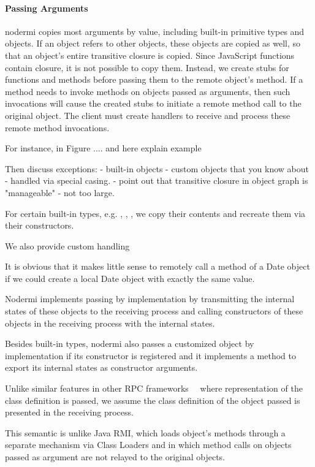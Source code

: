 \paragraph{Passing Arguments}
nodermi copies most arguments by value, including built-in primitive types
and objects.  If an object refers to other objects, these objects are copied 
as well, so that an object's entire transitive closure is copied.
Since JavaScript functions contain closure, it is not possible to copy them.
Instead, we create stubs for functions and methods before passing them
to the remote object's method.  If a method needs to invoke 
methods on objects passed as arguments, then such invocations
will cause the created stubs to initiate a remote method
call to the original object.  The client must create handlers
to receive and process these remote method invocations.

For instance, in Figure ....
and here explain example

Then discuss exceptions:
- built-in objects
- custom objects that you know about - handled via special casing.
- point out that transitive closure in object graph is "manageable" - not too large.


For certain built-in types, e.g. , , , 
we copy their contents and recreate them via their constructors.

We also provide custom handling

It is obvious that it makes little sense to remotely
call a method of a Date object if we could create
a local Date object with exactly the same value.

Nodermi implements passing by implementation by transmitting the internal
states of these objects to the receiving process and
calling constructors of these objects in the receiving process with the internal states.

Besides built-in types,
nodermi also passes a customized object by implementation if
its constructor is registered and it implements a method
to export its internal states as constructor arguments.

Unlike similar features
 in other RPC frameworks~\cite{birrell1993distributed}~\cite{j2eedoc}
 where representation of the class definition is passed,
we assume the class definition of the object passed is presented
in the receiving process.

This semantic is unlike Java RMI\cite{j2eedoc}, which loads
object's methods through a separate mechanism via Class Loaders
and in which method calls on objects passed as argument are not
relayed to the original objects.

